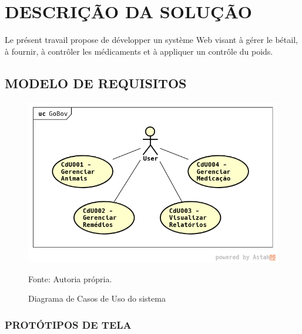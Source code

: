 %
%


\chapter{\textbf{DESCRIÇÃO DA SOLUÇÃO}}\label{chap:descSolucao}

Le présent travail propose de développer un système Web visant à gérer le bétail, à fournir, à contrôler les médicaments et à appliquer un contrôle du poids.

\section{MODELO DE REQUISITOS}

\begin{figure}[H]
	\begin{center}
		\caption{Diagrama de Casos de Uso do sistema}
		\includegraphics[width=6in]{../img/casosdeuso.png}

		Fonte: Autoria própria.
	\end{center}
\end{figure}

\newpage
\subsection{PROTÓTIPOS DE TELA}

